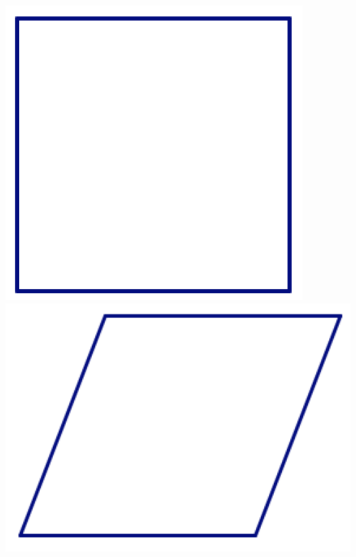 \documentclass[12pt, reqno]{amsart}
\theoremstyle{remark}
\theoremstyle{definition}
\numberwithin{equation}{section}  %
\begin{document}
\begin{center}
\includegraphics[scale = .45]{square2}
\qquad\qquad
\includegraphics[scale = .45]{rhomb1}


\end{center}
\end{document}
